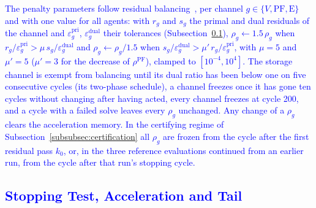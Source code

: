 \documentclass[preprint,12pt]{elsarticle}
\begin{document}
\textcolor{blue}{
    The penalty parameters follow residual balancing~\cite{boyd_admm_2011}, per channel $g \in \{V, \text{PF}, \text{E}\}$ and with one value for all agents: with $r_g$ and $s_g$ the primal and dual residuals of the channel and $\varepsilon^{\text{pri}}_g$, $\varepsilon^{\text{dual}}_g$ their tolerances (Subsection~\ref{app:admm_updated_stopping}), $\rho_g \gets 1.5\,\rho_g$ when $r_g/\varepsilon^{\text{pri}}_g > \mu\, s_g/\varepsilon^{\text{dual}}_g$ and $\rho_g \gets \rho_g/1.5$ when $s_g/\varepsilon^{\text{dual}}_g > \mu'\, r_g/\varepsilon^{\text{pri}}_g$, with $\mu = 5$ and $\mu' = 5$ ($\mu' = 3$ for the decrease of $\rho^{\text{PF}}$), clamped to $[10^{-4}, 10^{4}]$. The storage channel is exempt from balancing until its dual ratio has been below one on five consecutive cycles (its two-phase schedule), a channel freezes once it has gone ten cycles without changing after having acted, every channel freezes at cycle 200, and a cycle with a failed solve leaves every $\rho_g$ unchanged. Any change of a $\rho_g$ clears the acceleration memory. In the certifying regime of Subsection~\ref{subsubsec:certification} all $\rho_g$ are frozen from the cycle after the first residual pass $k_0$, or, in the three reference evaluations continued from an earlier run, from the cycle after that run's stopping cycle.
}

\subsection{\textcolor{blue}{Stopping Test, Acceleration and Tail}}
\label{app:admm_updated_stopping}
\end{document}
